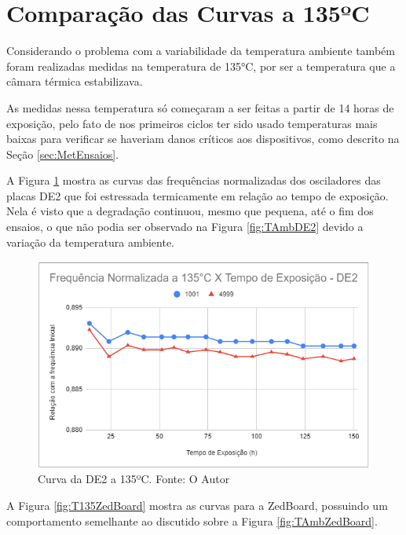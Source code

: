 \section{Comparação das Curvas a 135ºC}
\label{sec:ResT135}

Considerando o problema com a variabilidade da temperatura ambiente também foram realizadas medidas na temperatura de 135°C, por ser a temperatura que a câmara térmica estabilizava.

As medidas nessa temperatura só começaram a ser feitas a partir de 14 horas de exposição, pelo fato de nos primeiros ciclos ter sido usado temperaturas mais baixas para verificar se haveriam danos críticos aos dispositivos, como descrito na Seção \ref{sec:MetEnsaios}.

A Figura \ref{fig:T135DE2} mostra as curvas das frequências normalizadas dos osciladores das placas  DE2 que foi estressada termicamente em relação ao tempo de exposição. Nela é visto que a degradação continuou, mesmo que pequena, até o fim dos ensaios, o que não podia ser observado na Figura \ref{fig:TAmbDE2} devido a variação da temperatura ambiente.

\begin{figure}[H]
    \centering
    \includegraphics[scale=0.75]{figures/Resultados/T135DE2}
    \caption{Curva da DE2 a 135ºC. Fonte: O Autor}
    \label{fig:T135DE2}
\end{figure}

A Figura \ref{fig:T135ZedBoard} mostra as curvas para a ZedBoard, possuindo um comportamento semelhante ao discutido sobre a Figura \ref{fig:TAmbZedBoard}.

